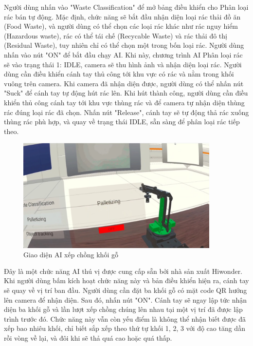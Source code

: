 Người dùng nhấn vào "Waste Classification" để mở bảng điều khiển cho Phân loại rác bán tự động. Mặc định, chức năng sẽ bắt đầu nhận diện loại rác thải đồ ăn (Food Waste), và người dùng có thể chọn các loại rác khác như rác nguy hiểm (Hazardous waste), rác có thể tái chế (Recycable Waste) và rác thải đô thị (Residual Waste), tuy nhiên chỉ có thể chọn một trong bốn loại rác. Người dùng nhấn vào nút "ON" để bắt đầu chạy AI. Khi này, chương trình AI Phân loại rác sẽ vào trạng thái 1: IDLE, camera sẽ thu hình ảnh và nhận diện loại rác. Người dùng cần điều khiển cánh tay thủ công tới khu vực có rác và nằm trong khối vuông trên camera. Khi camera đã nhận diện được, người dùng có thể nhấn nút "Suck" để cánh tay tự động hút rác lên. Khi hút thành công, người dùng cần điều khiển thủ công cánh tay tới khu vực thùng rác và để camera tự nhận diện thùng rác đúng loại rác đã chọn. Nhấn nút "Release", cánh tay sẽ tự động thả rác xuống thùng rác phù hợp, và quay về trạng thái IDLE, sẵn sàng để phân loại rác tiếp theo.

\begin{figure}[H]
    \centering
    \includegraphics[width=0.9\textwidth]{Images/Result/vr_blocks.jpg}
    \caption{Giao diện AI xếp chồng khối gỗ}
    \label{fig:vr_blocks}
\end{figure}

Đây là một chức năng AI thú vị được cung cấp sẵn bởi nhà sản xuất Hiwonder. Khi người dùng bấm kích hoạt chức năng này và bản điều khiển hiện ra, cánh tay sẽ quay về vị trí ban đầu. Người dùng cần đặt ba khối gỗ có mặt code QR hướng lên camera để nhận diện. Sau đó, nhấn nút "ON". Cánh tay sẽ ngay lập tức nhận diện ba khối gỗ và lần lượt xếp chồng chúng lên nhau tại một vị trí đã được lập trình trước đó. Chức năng này vẫn còn yếu điểm là không thể nhận biết được đã xếp bao nhiêu khối, chỉ biết sắp xếp theo thứ tự khối 1, 2, 3 với độ cao tăng dần rồi vòng về lại, và đôi khi sẽ thả quá cao hoặc quá thấp.

